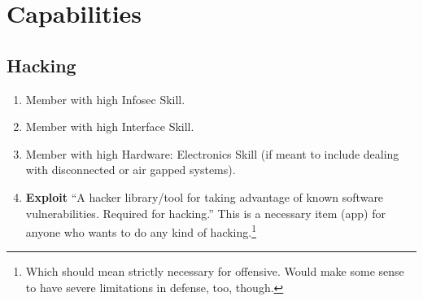 \section{Capabilities}

\subsection{Hacking}

\begin{enumerate}
    \item Member with high Infosec Skill.

    \item Member with high Interface Skill.

    \item Member with high Hardware: Electronics Skill (if meant to include dealing with disconnected or air gapped systems).
    
    \item \textbf{Exploit} “A hacker library/tool for taking advantage of known software vulnerabilities. Required for hacking.” \citep[pg. 326]{ep2e_1.1_2019} This is a necessary item (app) for anyone who wants to do any kind of hacking.\footnote{Which should mean strictly necessary for offensive. Would make some sense to have severe limitations in defense, too, though.}
\end{enumerate}